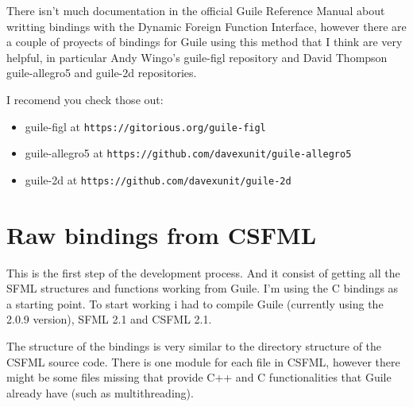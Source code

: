 \documentclass[latterpaper, leqno]{article}
\begin{document}
There isn't much documentation in the official Guile Reference Manual about writting bindings with the Dynamic Foreign Function Interface, however there are a couple of proyects of bindings for Guile using this method that I think are very helpful, in particular Andy Wingo's guile-figl repository and David Thompson guile-allegro5 and guile-2d repositories.

I recomend you check those out:
\begin{itemize}
\item guile-figl at \texttt{https://gitorious.org/guile-figl}
\item guile-allegro5 at \texttt{https://github.com/davexunit/guile-allegro5}
\item guile-2d at \texttt{https://github.com/davexunit/guile-2d}
\end{itemize}

\section{Raw bindings from CSFML}
This is the first step of the development process. And it consist of getting all the SFML structures and functions working from Guile. I'm using the C bindings as a starting point. To start working i had to compile Guile (currently using the 2.0.9 version), SFML 2.1 and CSFML 2.1.

The structure of the bindings is very similar to the directory structure of the CSFML source code. There is one module for each file in CSFML, however there might be some files missing that provide C++ and C functionalities that Guile already have (such as multithreading).
\end{document}
